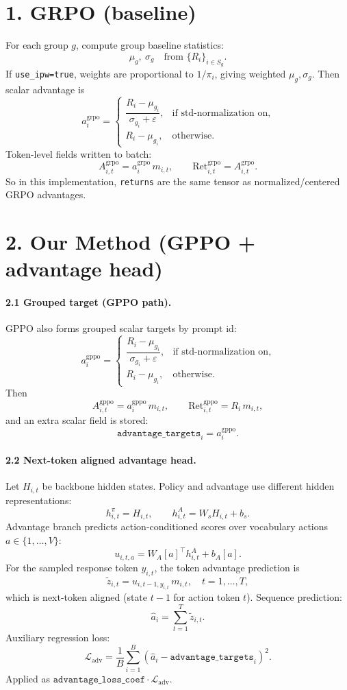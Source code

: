 \documentclass[11pt]{article}
\begin{document}
\section*{1. GRPO (baseline)}
For each group \(g\), compute group baseline statistics:
\[
\mu_g,\ \sigma_g \quad \text{from } \{R_i\}_{i\in S_g}.
\]
If \texttt{use\_ipw=true}, weights are proportional to \(1/\pi_i\), giving weighted \(\mu_g,\sigma_g\).
Then scalar advantage is
\[
a_i^{\text{grpo}}=
\begin{cases}
\dfrac{R_i-\mu_{g_i}}{\sigma_{g_i}+\varepsilon}, & \text{if std-normalization on},\\[6pt]
R_i-\mu_{g_i}, & \text{otherwise}.
\end{cases}
\]
Token-level fields written to batch:
\[
A_{i,t}^{\text{grpo}}=a_i^{\text{grpo}}\,m_{i,t},
\qquad
\mathrm{Ret}_{i,t}^{\text{grpo}}=A_{i,t}^{\text{grpo}}.
\]
So in this implementation, \texttt{returns} are the same tensor as normalized/centered GRPO advantages.

\section*{2. Our Method (GPPO + advantage head)}
\paragraph{2.1 Grouped target (GPPO path).}
GPPO also forms grouped scalar targets by prompt id:
\[
a_i^{\text{gppo}}=
\begin{cases}
\dfrac{R_i-\mu_{g_i}}{\sigma_{g_i}+\varepsilon}, & \text{if std-normalization on},\\[6pt]
R_i-\mu_{g_i}, & \text{otherwise}.
\end{cases}
\]
Then
\[
A_{i,t}^{\text{gppo}}=a_i^{\text{gppo}}\,m_{i,t},
\qquad
\mathrm{Ret}_{i,t}^{\text{gppo}}=R_i\,m_{i,t},
\]
and an extra scalar field is stored:
\[
\texttt{advantage\_targets}_i = a_i^{\text{gppo}}.
\]

\paragraph{2.2 Next-token aligned advantage head.}
Let \(H_{i,t}\) be backbone hidden states. Policy and advantage use different hidden representations:
\[
h_{i,t}^{\pi}=H_{i,t},\qquad
h_{i,t}^{A}=W_s H_{i,t}+b_s.
\]
Advantage branch predicts action-conditioned scores over vocabulary actions \(a\in\{1,\dots,V\}\):
\[
u_{i,t,a}=W_A[a]^\top h_{i,t}^{A}+b_A[a].
\]
For the sampled response token \(y_{i,t}\), the token advantage prediction is
\[
\tilde z_{i,t}=u_{i,t-1,y_{i,t}}\,m_{i,t},\quad t=1,\dots,T,
\]
which is next-token aligned (state \(t-1\) for action token \(t\)).
Sequence prediction:
\[
\hat a_i=\sum_{t=1}^{T}\tilde z_{i,t}.
\]
Auxiliary regression loss:
\[
\mathcal{L}_{\text{adv}}=\frac{1}{B}\sum_{i=1}^{B}\left(\hat a_i-\texttt{advantage\_targets}_i\right)^2.
\]
Applied as \(\texttt{advantage\_loss\_coef}\cdot \mathcal{L}_{\text{adv}}\).
\end{document}
